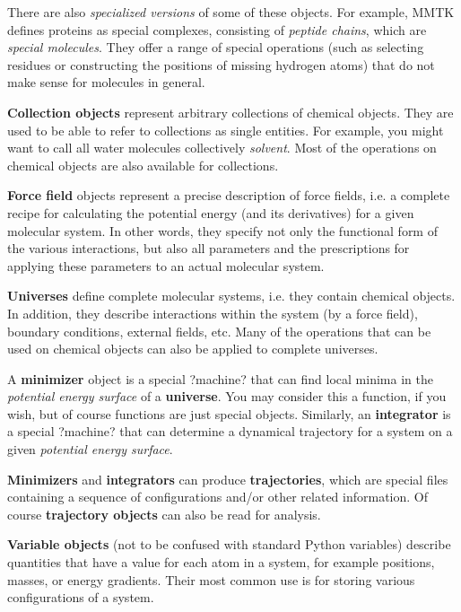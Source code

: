 \documentclass{article}
\begin{document}
There are also \textit{specialized versions} of some of these objects.  For example, MMTK defines proteins as special complexes, consisting of \textit{peptide chains}, which are \textit{special molecules}.  They offer a range of special operations (such as selecting residues or constructing the positions of missing hydrogen atoms) that do not make sense for molecules in general.

\textbf{Collection objects} represent arbitrary collections of chemical objects. They are used to be able to refer to collections as single entities. For example, you might want to call all water molecules collectively \textit{solvent}.  Most of the operations on chemical objects are also available for collections.

\textbf{Force field} objects represent a precise description of force fields, i.e. a complete recipe for calculating the potential energy (and its derivatives) for a given molecular system.  In other words, they specify not only the functional form of the various interactions, but also all parameters and the prescriptions for applying these parameters to an actual molecular system.

\textbf{Universes} define complete molecular systems, i.e. they contain chemical objects.  In addition, they describe interactions within the system (by a force field), boundary conditions, external fields, etc. Many of the operations that can be used on chemical objects can also be applied to complete universes.

A \textbf{minimizer} object is a special ?machine? that can find local minima in the \textit{potential energy surface} of a \textbf{universe}. You may consider this a function, if you wish, but of course functions are just special objects.  Similarly, an \textbf{integrator} is a special ?machine? that can determine a dynamical trajectory for a system on a given \textit{potential energy surface}.

\textbf{Minimizers} and \textbf{integrators} can produce \textbf{trajectories}, which are special files containing a sequence of configurations and/or other related information. Of course \textbf{trajectory objects} can also be read for analysis.

\textbf{Variable objects} (not to be confused with standard Python variables) describe quantities that have a value for each atom in a system, for example positions, masses, or energy gradients. Their most common use is for storing various configurations of a system.
\end{document}
